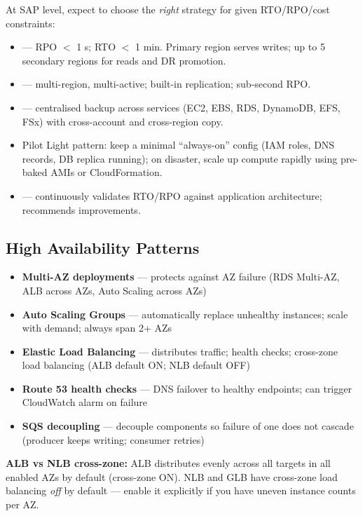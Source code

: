 \begin{sapdepth}
At SAP level, expect to choose the \emph{right} strategy for given RTO/RPO/cost constraints:
\begin{itemize}
  \item {} --- RPO $<$ 1 s; RTO $<$ 1 min. Primary region serves writes; up to 5 secondary regions for reads and DR promotion.
  \item {} --- multi-region, multi-active; built-in replication; sub-second RPO.
  \item {} --- centralised backup across services (EC2, EBS, RDS, DynamoDB, EFS, FSx) with cross-account and cross-region copy.
  \item Pilot Light pattern: keep a minimal ``always-on'' config (IAM roles, DNS records, DB replica running); on disaster, scale up compute rapidly using pre-baked AMIs or CloudFormation.
  \item {} --- continuously validates RTO/RPO against application architecture; recommends improvements.
\end{itemize}
\end{sapdepth}

\subsection{High Availability Patterns}

\begin{keyfacts}
\begin{itemize}
  \item \textbf{Multi-AZ deployments} --- protects against AZ failure (RDS Multi-AZ, ALB across AZs, Auto Scaling across AZs)
  \item \textbf{Auto Scaling Groups} --- automatically replace unhealthy instances; scale with demand; always span 2+ AZs
  \item \textbf{Elastic Load Balancing} --- distributes traffic; health checks; cross-zone load balancing (ALB default ON; NLB default OFF)
  \item \textbf{Route 53 health checks} --- DNS failover to healthy endpoints; can trigger CloudWatch alarm on failure
  \item \textbf{SQS decoupling} --- decouple components so failure of one does not cascade (producer keeps writing; consumer retries)
\end{itemize}
\end{keyfacts}

\begin{gotcha}
\textbf{ALB vs NLB cross-zone:} ALB distributes evenly across all targets in all enabled AZs by default (cross-zone ON). NLB and GLB have cross-zone load balancing \emph{off} by default --- enable it explicitly if you have uneven instance counts per AZ.
\end{gotcha}
